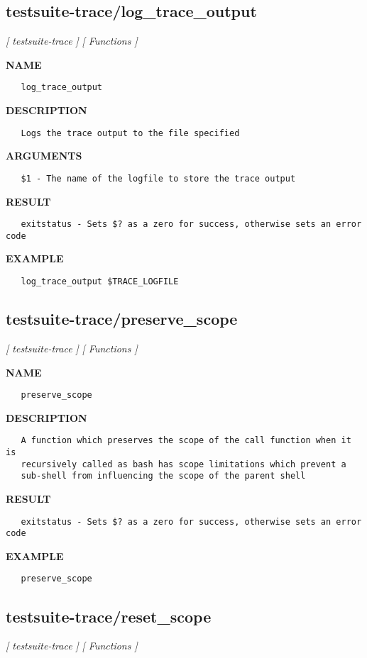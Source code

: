 \subsection{testsuite-trace/log\_trace\_output}
\textsl{[ testsuite-trace ]}
\textsl{[ Functions ]}

\label{ch:robo56}
\label{ch:testsuite_trace_log_trace_output}
\textbf{NAME}
\begin{verbatim}
   log_trace_output
\end{verbatim}
\textbf{DESCRIPTION}
\begin{verbatim}
   Logs the trace output to the file specified
\end{verbatim}
\textbf{ARGUMENTS}
\begin{verbatim}
   $1 - The name of the logfile to store the trace output
\end{verbatim}
\textbf{RESULT}
\begin{verbatim}
   exitstatus - Sets $? as a zero for success, otherwise sets an error code
\end{verbatim}
\textbf{EXAMPLE}
\begin{verbatim}
   log_trace_output $TRACE_LOGFILE
\end{verbatim}
\newpage
\subsection{testsuite-trace/preserve\_scope}
\textsl{[ testsuite-trace ]}
\textsl{[ Functions ]}

\label{ch:robo57}
\label{ch:testsuite_trace_preserve_scope}
\textbf{NAME}
\begin{verbatim}
   preserve_scope
\end{verbatim}
\textbf{DESCRIPTION}
\begin{verbatim}
   A function which preserves the scope of the call function when it is
   recursively called as bash has scope limitations which prevent a
   sub-shell from influencing the scope of the parent shell
\end{verbatim}
\textbf{RESULT}
\begin{verbatim}
   exitstatus - Sets $? as a zero for success, otherwise sets an error code
\end{verbatim}
\textbf{EXAMPLE}
\begin{verbatim}
   preserve_scope   
\end{verbatim}
\newpage
\subsection{testsuite-trace/reset\_scope}
\textsl{[ testsuite-trace ]}
\textsl{[ Functions ]}

